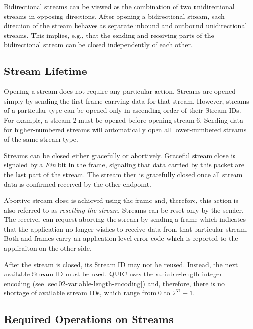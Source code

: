Bidirectional streams can be viewed as the combination of two unidirectional streams in opposing
directions. After opening a bidirectional stream, each direction of the stream behaves as separate
inbound and outbound unidirectional streams. This implies, e.g., that the sending and receiving
parts of the bidirectional stream can be closed independently of each other.

\subsection{Stream Lifetime}

Opening a stream does not require any particular action. Streams are opened simply by sending the
first \STREAM{} frame carrying data for that stream. However, streams of a particular type can be
opened only in ascending order of their Stream IDs. For example, a stream 2 must be opened before
opening stream 6. Sending data for higher-numbered streams will automatically open all
lower-numbered streams of the same stream type.

Streams can be closed either gracefully or abortively. Graceful stream close is signaled by a
\textit{Fin} bit in the \STREAM{} frame, signaling that data carried by this packet are the last
part of the stream. The stream then is gracefully closed once all stream data is confirmed received
by the other endpoint.

Abortive stream close is achieved using the \RESETSTREAM{} frame and, therefore, this action is also
referred to as \textit{resetting the stream}. Streams can be reset only by the sender. The receiver
can request aborting the stream by sending a \STOPSENDING{} frame which indicates that the
application no longer wishes to receive data from that particular stream. Both \RESETSTREAM{} and
\STOPSENDING{} frames carry an application-level error code which is reported to the applicaiton on
the other side.

After the stream is closed, its Stream ID may not be reused. Instead, the next available Stream ID
must be used. QUIC uses the variable-length integer encoding (see
\autoref{sec:02-variable-length-encoding}) and, therefore, there is no shortage of available stream
IDs, which range from 0 to $2^{62}-1$.

\subsection{Required Operations on Streams}

